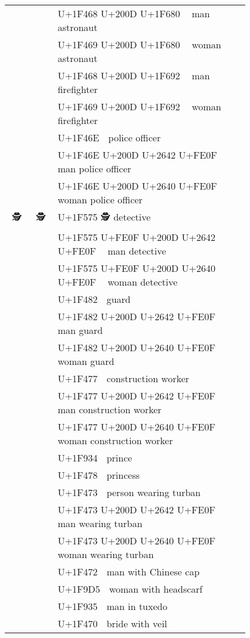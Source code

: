 \documentclass[a4paper,12pt]{article}
\newcommand{\fontA}[1]{{\fontspec[RawFeature={mode=harf,+dist,+ccmp}]{Segoe UI Emoji} #1}}
\newcommand{\fontB}[1]{{\fontspec[RawFeature={mode=harf,+dist,+ccmp}]{Noto Color Emoji} #1}}
\begin{document}
\begin{longtable}[c]{ccp{0.8\linewidth}}
\fontA{👨‍🚀}&\fontB{👨‍🚀}&U+1F468 U+200D U+1F680 👨‍🚀 man astronaut\\
\fontA{👩‍🚀}&\fontB{👩‍🚀}&U+1F469 U+200D U+1F680 👩‍🚀 woman astronaut\\
\fontA{👨‍🚒}&\fontB{👨‍🚒}&U+1F468 U+200D U+1F692 👨‍🚒 man firefighter\\
\fontA{👩‍🚒}&\fontB{👩‍🚒}&U+1F469 U+200D U+1F692 👩‍🚒 woman firefighter\\
\fontA{👮}&\fontB{👮}&U+1F46E 👮 police officer\\
\fontA{👮‍♂️}&\fontB{👮‍♂️}&U+1F46E U+200D U+2642 U+FE0F 👮‍♂️ man police officer\\
\fontA{👮‍♀️}&\fontB{👮‍♀️}&U+1F46E U+200D U+2640 U+FE0F 👮‍♀️ woman police officer\\
\fontA{🕵}&\fontB{🕵}&U+1F575 🕵 detective\\
\fontA{🕵️‍♂️}&\fontB{🕵️‍♂️}&U+1F575 U+FE0F U+200D U+2642 U+FE0F 🕵️‍♂️ man detective\\
\fontA{🕵️‍♀️}&\fontB{🕵️‍♀️}&U+1F575 U+FE0F U+200D U+2640 U+FE0F 🕵️‍♀️ woman detective\\
\fontA{💂}&\fontB{💂}&U+1F482 💂 guard\\
\fontA{💂‍♂️}&\fontB{💂‍♂️}&U+1F482 U+200D U+2642 U+FE0F 💂‍♂️ man guard\\
\fontA{💂‍♀️}&\fontB{💂‍♀️}&U+1F482 U+200D U+2640 U+FE0F 💂‍♀️ woman guard\\
\fontA{👷}&\fontB{👷}&U+1F477 👷 construction worker\\
\fontA{👷‍♂️}&\fontB{👷‍♂️}&U+1F477 U+200D U+2642 U+FE0F 👷‍♂️ man construction worker\\
\fontA{👷‍♀️}&\fontB{👷‍♀️}&U+1F477 U+200D U+2640 U+FE0F 👷‍♀️ woman construction worker\\
\fontA{🤴}&\fontB{🤴}&U+1F934 🤴 prince\\
\fontA{👸}&\fontB{👸}&U+1F478 👸 princess\\
\fontA{👳}&\fontB{👳}&U+1F473 👳 person wearing turban\\
\fontA{👳‍♂️}&\fontB{👳‍♂️}&U+1F473 U+200D U+2642 U+FE0F 👳‍♂️ man wearing turban\\
\fontA{👳‍♀️}&\fontB{👳‍♀️}&U+1F473 U+200D U+2640 U+FE0F 👳‍♀️ woman wearing turban\\
\fontA{👲}&\fontB{👲}&U+1F472 👲 man with Chinese cap\\
\fontA{🧕}&\fontB{🧕}&U+1F9D5 🧕 woman with headscarf\\
\fontA{🤵}&\fontB{🤵}&U+1F935 🤵 man in tuxedo\\
\fontA{👰}&\fontB{👰}&U+1F470 👰 bride with veil\\

\end{longtable}
\end{document}
